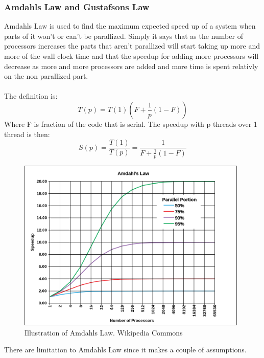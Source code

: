 \documentclass[10pt,a4paper]{article}
\begin{document}
\subsubsection{Amdahls Law and Gustafsons Law}
Amdahls Law is used to find the maximum expected speed up of a system when parts of it won't or can't be parallized. Simply it says that as the number of processors increases the parts that aren't parallized will start taking up more and more of the wall clock time and that the speedup for adding more processors will decrease as more and more processors are added and more time is spent relativly on the non parallized part.\\
\\
The definition is:\\
$$T(p)=T(1)(F+\frac{1}{p}(1-F))$$
Where F is fraction of the code that is serial. The speedup with p threads over 1 thread is then:
$$S(p)=\frac{T(1)}{T(p)}=\frac{1}{F+\frac{1}{p}(1-F)}$$

\begin{figure}[h]
    \centering
    \includegraphics[width=11cm]{AmdahlsLaw.png}
    \caption{Illustration of Amdahls Law. Wikipedia Commons}
    \label{fig:AmdahlsLaw}
\end{figure}

There are limitation to Amdahls Law since it makes a couple of assumptions.
\end{document}
